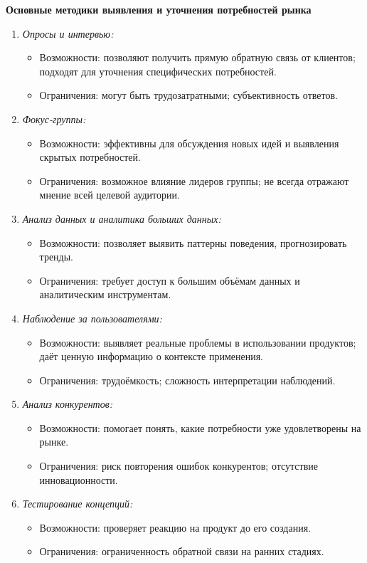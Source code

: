 \textbf{Основные методики выявления и уточнения потребностей рынка}

\begin{enumerate}
    \item \textit{Опросы и интервью:}
        \begin{itemize}
            \item Возможности: позволяют получить прямую обратную связь от клиентов; подходят для уточнения специфических потребностей.
            \item Ограничения: могут быть трудозатратными; субъективность ответов.
        \end{itemize}
    \item \textit{Фокус-группы:}
        \begin{itemize}
            \item Возможности: эффективны для обсуждения новых идей и выявления скрытых потребностей.
            \item Ограничения: возможное влияние лидеров группы; не всегда отражают мнение всей целевой аудитории.
        \end{itemize}
    \item \textit{Анализ данных и аналитика больших данных:}
    \begin{itemize}
        \item Возможности: позволяет выявить паттерны поведения, прогнозировать тренды.
        \item Ограничения: требует доступ к большим объёмам данных и аналитическим инструментам.
    \end{itemize}
    \item \textit{Наблюдение за пользователями:}
        \begin{itemize}
            \item Возможности: выявляет реальные проблемы в использовании продуктов; даёт ценную информацию о контексте применения.
            \item Ограничения: трудоёмкость; сложность интерпретации наблюдений.
        \end{itemize}
    \item \textit{Анализ конкурентов:}
        \begin{itemize}
            \item Возможности: помогает понять, какие потребности уже удовлетворены на рынке.
            \item Ограничения: риск повторения ошибок конкурентов; отсутствие инновационности.
        \end{itemize}
    \item\textit{Тестирование концепций:}
        \begin{itemize}
            \item Возможности: проверяет реакцию на продукт до его создания.
            \item Ограничения: ограниченность обратной связи на ранних стадиях.
        \end{itemize}
\end{enumerate}

